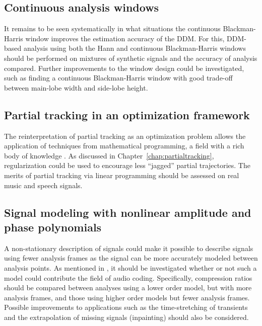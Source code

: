 \subsection{Continuous analysis windows}

It remains to be seen systematically in what situations the continuous
Blackman-Harris window improves the estimation accuracy of the DDM. For this,
DDM-based analysis using both the Hann and continuous Blackman-Harris windows
should be performed on mixtures of synthetic signals and the accuracy of
analysis compared. Further improvements to the window design could be
investigated, such as finding a continuous Blackman-Harris window with good
trade-off between main-lobe width and side-lobe height.

\subsection{Partial tracking in an optimization framework}

The reinterpretation of partial tracking as an optimization problem allows the
application of techniques from mathematical programming, a field with
a rich body of knowledge \cite{boyd2004convex}. As discussed in
Chapter~\ref{chap:partialtracking}, regularization could be used to encourage
less ``jagged'' partial trajectories. The merits of partial tracking via
linear programming should be assessed on real music and speech signals.

\subsection{Signal modeling with nonlinear amplitude and phase polynomials}

A non-stationary description of signals could make it possible to describe
signals using fewer analysis frames as the signal can be more accurately modeled
between analysis points. As mentioned in \cite{betser2009sinusoidal}, it should
be investigated whether or not such a model could contribute the field of audio
coding. Specifically, compression ratios should be compared between analyses
using a lower order model, but with more analysis frames, and those using higher order
models but fewer analysis frames. Possible improvements to applications such as
the time-stretching of transients and the extrapolation of missing signals
(inpainting) should also be considered.
